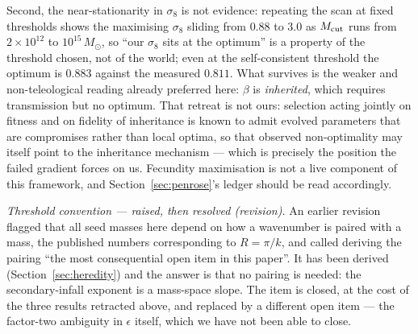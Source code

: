 \documentclass[11pt]{article}
\begin{document}
Second, the near-stationarity in $\sigma_8$ is not evidence: repeating the scan at fixed
thresholds shows the maximising $\sigma_8$ sliding from $0.88$ to $3.0$ as $M_{\rm cut}$ runs from
$2\times10^{12}$ to $10^{15}\,M_\odot$, so ``our $\sigma_8$ sits at the optimum'' is a property of
the threshold chosen, not of the world; even at the self-consistent threshold the optimum is
$0.883$ against the measured $0.811$. What survives is the weaker and non-teleological reading
already preferred here: $\beta$ is \emph{inherited}, which requires transmission but no optimum. That retreat is not ours: selection acting jointly on fitness and on fidelity of inheritance is known to admit evolved parameters that are compromises rather than local optima, so that observed non-optimality may itself point to the inheritance mechanism \cite{Altenberg2013} --- which is precisely the position the failed gradient forces on us.
Fecundity maximisation is not a live component of this framework, and Section~\ref{sec:penrose}'s
ledger should be read accordingly.

\emph{Threshold convention --- raised, then resolved (revision).} An earlier revision flagged that
all seed masses here depend on how a wavenumber is paired with a mass, the published numbers
corresponding to $R = \pi/k$, and called deriving the pairing ``the most consequential open item in
this paper''. It has been derived (Section~\ref{sec:heredity}) and the answer is that no pairing is
needed: the secondary-infall exponent is a mass-space slope. The item is closed, at the cost of the
three results retracted above, and replaced by a different open item --- the factor-two ambiguity in
$\epsilon$ itself, which we have not been able to close.
\end{document}
